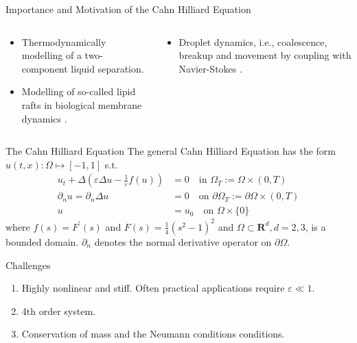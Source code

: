 \begin{frame}{Importance and Motivation of the Cahn Hilliard Equation}
    \begin{columns}
        \begin{column}{0.5\textwidth}
            \begin{itemize}
                \item Thermodynamically modelling of a two-component liquid separation\footnotemark[1].
            \item Modelling of so-called lipid rafts in biological membrane dynamics \footnotemark[2].
            \end{itemize}
        \end{column}
        \begin{column}{0.5\textwidth}
            \begin{itemize}
                \item Droplet dynamics, i.e., coalescence, breakup and movement by coupling with Navier-Stokes \footnotemark[3].
            \end{itemize}
        \end{column}
    \end{columns}
\end{frame}

\begin{frame}
    \begin{block}{The Cahn Hilliard Equation}
        The general Cahn Hilliard Equation  has the form $u( t,x): \Omega \mapsto [-1,1]   $ s.t.
            \[
            \begin{split}
                 u_t+\Delta\left(\varepsilon \Delta u-\frac{1}{\varepsilon} f(u)\right)&=0 \quad \text{in } \Omega_T:=\Omega \times(0, T) \\
\partial_n u=\partial_n \Delta u& =0 \quad \text{on } \partial \Omega_T:=\partial \Omega \times(0, T) \\
 u & =u_0 \quad \text{on } \Omega \times\{0\}
            \end{split}
            \]
where $f(s)=F^{\prime}(s)$ and $F(s)=\frac{1}{4}\left(s^2-1\right)^2$ and $\Omega \subset \mathbf{R}^d, d=2,3$, is a bounded domain. $\partial_n$ denotes the normal derivative operator on $\partial \Omega$.
\end{block}

\begin{block}{Challenges}
    \begin{enumerate}
        \item Highly nonlinear and stiff. Often practical applications require $\varepsilon \ll 1$.
        \item 4th order system.
        \item Conservation of mass and the Neumann conditions conditions.
    \end{enumerate}
\end{block}

\end{frame}

